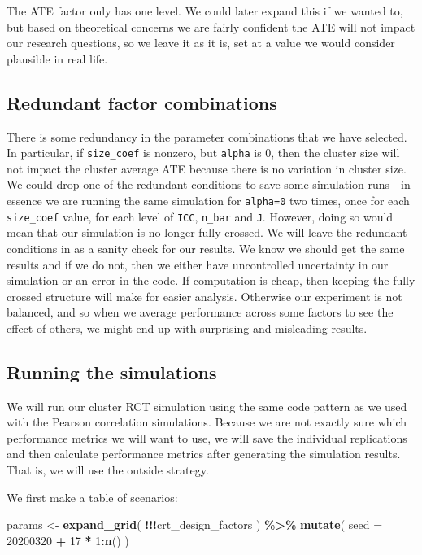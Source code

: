 \documentclass[
]{book}
\newenvironment{Shaded}{\begin{snugshade}}{\end{snugshade}}
\newcommand{\AttributeTok}[1]{\textcolor[rgb]{0.13,0.29,0.53}{#1}}
\newcommand{\DecValTok}[1]{\textcolor[rgb]{0.00,0.00,0.81}{#1}}
\newcommand{\FunctionTok}[1]{\textcolor[rgb]{0.13,0.29,0.53}{\textbf{#1}}}
\newcommand{\NormalTok}[1]{#1}
\newcommand{\OtherTok}[1]{\textcolor[rgb]{0.56,0.35,0.01}{#1}}
\newcommand{\SpecialCharTok}[1]{\textcolor[rgb]{0.81,0.36,0.00}{\textbf{#1}}}
\begin{document}
The ATE factor only has one level. We could later expand this if we wanted to, but based on theoretical concerns we are fairly confident the ATE will not impact our research questions, so we leave it as it is, set at a value we would consider plausible in real life.

\subsection{Redundant factor combinations}\label{redundant-factor-combinations}

There is some redundancy in the parameter combinations that we have selected.
In particular, if \texttt{size\_coef} is nonzero, but \texttt{alpha} is 0, then the cluster size will not impact the cluster average ATE because there is no variation in cluster size.
We could drop one of the redundant conditions to save some simulation runs---in essence we are running the same simulation for \texttt{alpha=0} two times, once for each \texttt{size\_coef} value, for each level of \texttt{ICC}, \texttt{n\_bar} and \texttt{J}.
However, doing so would mean that our simulation is no longer fully crossed.
We will leave the redundant conditions in as a sanity check for our results.
We know we should get the same results and if we do not, then we either have uncontrolled uncertainty in our simulation or an error in the code.
If computation is cheap, then keeping the fully crossed structure will make for easier analysis.
Otherwise our experiment is not balanced, and so when we average performance across some factors to see the effect of others, we might end up with surprising and misleading results.

\subsection{Running the simulations}\label{running-the-simulations}

We will run our cluster RCT simulation using the same code pattern as we used with the Pearson correlation simulations.
Because we are not exactly sure which performance metrics we will want to use, we will save the individual replications and then calculate performance metrics after generating the simulation results.
That is, we will use the outside strategy.

We first make a table of scenarios:

\begin{Shaded}
\begin{Highlighting}[]
\NormalTok{params }\OtherTok{\textless{}{-}} 
  \FunctionTok{expand\_grid}\NormalTok{( }\SpecialCharTok{!!!}\NormalTok{crt\_design\_factors ) }\SpecialCharTok{\%\textgreater{}\%}
  \FunctionTok{mutate}\NormalTok{(}
    \AttributeTok{seed =} \DecValTok{20200320} \SpecialCharTok{+} \DecValTok{17} \SpecialCharTok{*} \DecValTok{1}\SpecialCharTok{:}\FunctionTok{n}\NormalTok{()}
\NormalTok{  )}
\end{Highlighting}
\end{Shaded}
\end{document}
